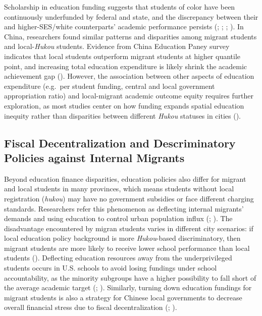 \documentclass[
  man,
  floatsintext,
  longtable,
  nolmodern,
  notxfonts,
  notimes,
  colorlinks=true,linkcolor=blue,citecolor=blue,urlcolor=blue]{apa7}
\begin{document}
Scholarship in education funding suggests that students of color have
been continuously underfunded by federal and state, and the discrepancy
between their and higher-SES/white counterparts' academic performance
persists (; ;
;
). In China, researchers
found similar patterns and disparities among migrant students and
local-\emph{Hukou} students. Evidence from China Education Paney survey
indicates that local students outperform migrant students at higher
quantile point, and increasing total education expenditure is likely
shrink the academic achievement gap
().
However, the association between other aspects of education expenditure
(e.g.~per student funding, central and local government appropriation
ratio) and local-migrant academic outcome equity requires further
exploration, as most studies center on how funding expands spatial
education inequity rather than disparities between different
\emph{Hukou} statuses in cities
().

\subsection{Fiscal Decentralization and Descriminatory Policies against
Internal
Migrants}\label{fiscal-decentralization-and-descriminatory-policies-against-internal-migrants}

Beyond education finance disparities, education policies also differ for
migrant and local students in many provinces, which means students
without local registration (\emph{hukou}) may have no government
subsidies or face different charging standards. Researchers refer this
phenomenon as deflecting internal migrants' demands and using education
to control urban population influx
(; ). The disadvantage encountered by migran students varies in
different city scenarios: if local education policy background is more
\emph{Hukou}-based discriminatory, then migrant students are more likely
to receive lower school performance than local students
(). Deflecting
education resources away from the underprivileged students occurs in
U.S. schools to avoid losing fundings under school accountability, as
the minority subgroups have a higher possibility to fall short of the
average academic target
(;
). Similarly, turning
down education fundings for migrant students is also a strategy for
Chinese local governments to decrease overall financial stress due to
fiscal decentralization
(; ).
\end{document}
